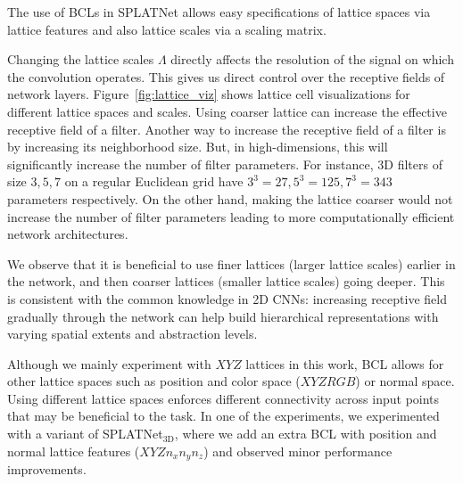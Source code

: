 \documentclass[10pt,twocolumn,letterpaper]{article}
\begin{document}
The use of BCLs in SPLATNet allows easy specifications of lattice spaces via lattice features and also lattice scales via a scaling matrix.

Changing the lattice scales $\Lambda$ directly affects the resolution of the signal on which the convolution operates. This gives us direct control over the receptive fields of network layers.
Figure~\ref{fig:lattice_viz} shows lattice cell visualizations for different lattice spaces and scales.
Using coarser lattice can increase the effective receptive field of a filter.
Another way to increase the receptive field of a filter is by increasing its neighborhood size. 
But, in high-dimensions, this will significantly increase the number of filter parameters. For instance, 3D filters of size $3, 5, 7$ on a regular Euclidean grid have $3^3=27, 5^3=125, 7^3=343$ parameters respectively.
On the other hand, 
making the lattice coarser would not increase the number of filter parameters leading to more computationally efficient network architectures.

We observe that it is beneficial to use finer lattices (larger lattice scales) earlier in the network, and then coarser lattices (smaller lattice scales) going deeper. This is consistent with the common knowledge in 2D CNNs: increasing receptive field gradually through the network can help build hierarchical representations with varying spatial extents and abstraction levels. 

Although we mainly experiment with $XYZ$ lattices in this work, BCL allows for other lattice spaces such as position and color space ($XYZRGB$) or normal space. Using different lattice spaces enforces different connectivity across input points that may be beneficial to the task. In one of the experiments, we experimented with a variant of SPLATNet$_{\text{3D}}$, where
we add an extra BCL with position and normal lattice features ($XYZn_xn_yn_z$) and observed minor
performance improvements.
\end{document}
